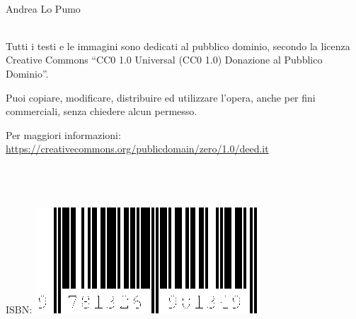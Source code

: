 

\leavevmode\\
\textcopyright Andrea Lo Pumo \\
\leavevmode\\

\vfill

Tutti i testi e le immagini sono dedicati al pubblico dominio, secondo la licenza Creative Commons ``CC0 1.0 Universal (CC0 1.0) Donazione al Pubblico Dominio''.

Puoi copiare, modificare, distribuire ed utilizzare l'opera, anche per fini commerciali, senza chiedere alcun permesso.

Per maggiori informazioni: \url{https://creativecommons.org/publicdomain/zero/1.0/deed.it}

\leavevmode\\
\leavevmode\\
\leavevmode\\

ISBN: \includegraphics{lulu/isbn/978-1-326-90134-9-320px.png}
